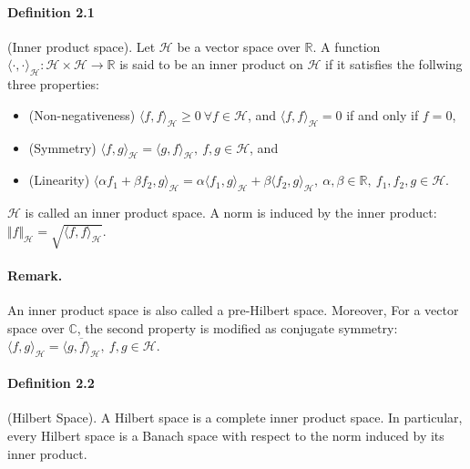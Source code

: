 \documentclass{article}
\begin{document}
\paragraph{Definition 2.1} (Inner product space). Let $\mathcal{H}$ be a vector space over $\mathbb{R}$. A function $\langle\cdot,\cdot\rangle_\mathcal{H}:\mathcal{H}\times\mathcal{H}\to\mathbb{R}$ is said to be an inner product on $\mathcal{H}$ if it satisfies the follwing three properties:
\begin{itemize}
	\item (Non-negativeness) $\langle f,f\rangle_\mathcal{H} \geq 0\ \forall f\in\mathcal{H}$, and $\langle f,f\rangle_\mathcal{H}=0$ if and only if $f=0$,
	\item (Symmetry) $\langle f,g\rangle_\mathcal{H} = \langle g, f\rangle_\mathcal{H},\ f,g\in\mathcal{H}$, and
	\item (Linearity) $\langle \alpha f_1 + \beta f_2,g\rangle_\mathcal{H} = \alpha\langle f_1,g\rangle_\mathcal{H} + \beta\langle f_2,g\rangle_\mathcal{H},\ \alpha,\beta\in\mathbb{R},\ f_1,f_2,g\in\mathcal{H}.$
\end{itemize}
$\mathcal{H}$ is called an inner product space. A norm is induced by the inner product: $\Vert f\Vert_\mathcal{H} = \sqrt{\langle f,f\rangle_\mathcal{H}}$.

\paragraph{Remark.} An inner product space is also called a pre-Hilbert space. Moreover, For a vector space over $\mathbb{C}$, the second property is modified as conjugate symmetry: $\langle f,g\rangle_\mathcal{H} = \overline{\langle g, f\rangle_\mathcal{H}},\ f,g\in\mathcal{H}.$

\paragraph{Definition 2.2} (Hilbert Space). A Hilbert space is a complete inner product space. In particular, every Hilbert space is a Banach space with respect to the norm induced by its inner product.
\end{document}
